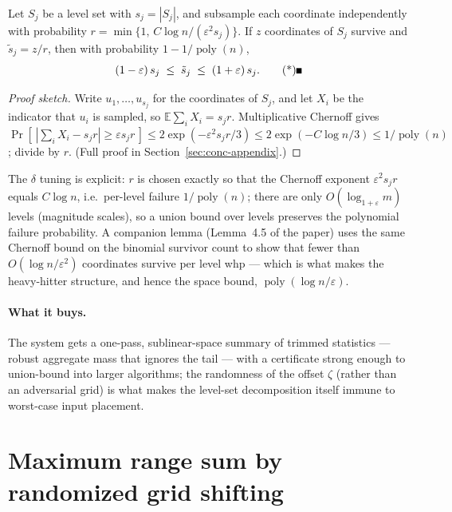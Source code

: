 \begin{lemma}
\label{lem:conc-trimmed-level}
Let $S_j$ be a level set with $s_j = |S_j|$, and subsample each coordinate independently
with probability $r = \min\{1,\, C\log n/(\varepsilon^2 s_j)\}$. If $z$ coordinates of
$S_j$ survive and $\tilde{s}_j = z/r$, then with probability $1 - 1/\operatorname{poly}(n)$,
\[
(1-\varepsilon)\,s_j \;\le\; \tilde{s}_j \;\le\; (1+\varepsilon)\,s_j . \eopm
\]
\end{lemma}

\begin{proof}[Proof sketch]
Write $u_1,\dots,u_{s_j}$ for the coordinates of $S_j$, and let $X_i$ be the indicator
that $u_i$ is sampled, so $\mathbb{E}\sum_i X_i = s_j r$. Multiplicative Chernoff gives
$\Pr[\,|\sum_i X_i - s_jr| \ge \varepsilon s_j r\,] \le
2\exp(-\varepsilon^2 s_j r/3) \le 2\exp(-C\log n/3) \le 1/\operatorname{poly}(n)$;
divide by $r$. (Full proof in Section~\ref{sec:conc-appendix}.)
\end{proof}

The $\delta$ tuning is explicit: $r$ is chosen exactly so that the Chernoff exponent
$\varepsilon^2 s_j r$ equals $C \log n$, i.e.\ per-level failure $1/\operatorname{poly}(n)$;
there are only $O(\log_{1+\varepsilon} m)$ levels (magnitude scales), so a union bound
over levels preserves the polynomial failure probability. A companion lemma (Lemma~4.5 of
the paper) uses the same Chernoff bound on the binomial survivor count to show that fewer
than $O(\log n/\varepsilon^2)$ coordinates survive per level whp --- which is what makes
the heavy-hitter structure, and hence the space bound,
$\operatorname{poly}(\log n/\varepsilon)$.

\paragraph{What it buys.}
The system gets a one-pass, sublinear-space summary of trimmed statistics --- robust
aggregate mass that ignores the tail --- with a certificate strong enough to union-bound
into larger algorithms; the randomness of the offset $\zeta$ (rather than an adversarial
grid) is what makes the level-set decomposition itself immune to worst-case input
placement.

\section{Maximum range sum by randomized grid shifting}
\label{sec:conc-maxrs}

